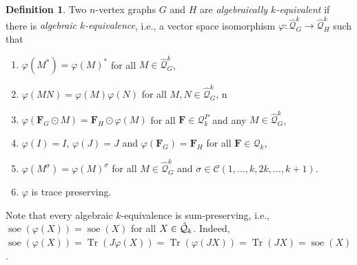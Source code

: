 \documentclass[a4paper,onecolumn,11pt,accepted=2026-01-06]{quantumarticle}
\theoremstyle{plain}
\theoremstyle{remark}
\theoremstyle{definition}
\newtheorem{definition}[thm]{Definition}
\DeclareMathOperator{\tr}{Tr}
\DeclareMathOperator{\soe}{soe}
\newcommand{\cyclicpermutations}{\mathscr{C}(1,\dots, k, 2k, \dots, k+1)}
\begin{document}
\begin{definition}\label{def:algebraic-k-quiv}
  Two $n$-vertex graphs $G$ and $H$ are \emph{algebraically $k$-equivalent} if there is \emph{algebraic $k$-equivalence}, i.e., a vector space isomorphism $\varphi\colon \widehat{\mathcal{Q}}_G^k \to \widehat{\mathcal{Q}}_H^k$ such that
  \begin{enumerate}
    \item $\varphi(M^*) = \varphi(M)^*$ for all $M\in\widehat{\mathcal{Q}}_G^k$,
    \item $\varphi(MN) = \varphi(M)\varphi(N)$ for all $M,N\in\widehat{\mathcal{Q}}_G^k$,
n    \item $\varphi(\boldsymbol{F}_G \odot M) = \boldsymbol{F}_H\odot\varphi(M)$ for all 
    $\boldsymbol{F}\in\mathcal{Q}_k^P$ and any $M\in\widehat{\mathcal{Q}}_G^k$,
    \item $\varphi(I) = I$, $\varphi(J) = J$  and $\varphi(\boldsymbol{F}_G) = \boldsymbol{F}_H$ for all $\boldsymbol{F}\in\mathcal{Q}_k$,
    \item $\varphi(M^\sigma) = \varphi(M)^\sigma$ for all $M\in\widehat{\mathcal{Q}}_G^k$ and $\sigma \in \cyclicpermutations$.
    \item $\varphi$ is trace preserving. 
  \end{enumerate}
\end{definition}


Note that every algebraic $k$-equivalence is sum-preserving, i.e., $\soe(\varphi(X)) = \soe(X)$ for all $X \in \hat{{\mathcal Q}}_k$. Indeed, $\soe(\varphi(X)) = \tr(J\varphi(X)) = \tr(\varphi(JX)) = \tr(JX) = \soe(X)$. 
\end{document}
